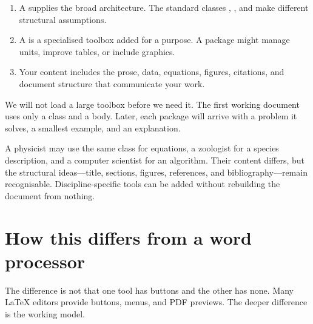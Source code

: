 \begin{enumerate}
  \item A  supplies the broad architecture. The standard
        classes , , and  make different
        structural assumptions.
  \item A  is a specialised toolbox added for a purpose. A
        package might manage units, improve tables, or include graphics.
  \item Your content includes the prose, data, equations, figures, citations,
        and document structure that communicate your work.
\end{enumerate}

We will not load a large toolbox before we need it. The first working document
uses only a class and a body. Later, each package will arrive with a problem it
solves, a smallest example, and an explanation.

\begin{scienceinpractice}
A physicist may use the same  class for equations, a zoologist
for a species description, and a computer scientist for an algorithm. Their
content differs, but the structural ideas---title, sections, figures,
references, and bibliography---remain recognisable. Discipline-specific tools
can be added without rebuilding the document from nothing.
\end{scienceinpractice}

\section{How this differs from a word processor}

The difference is not that one tool has buttons and the other has none. Many
\LaTeX{} editors provide buttons, menus, and PDF previews. The deeper difference
is the working model.

